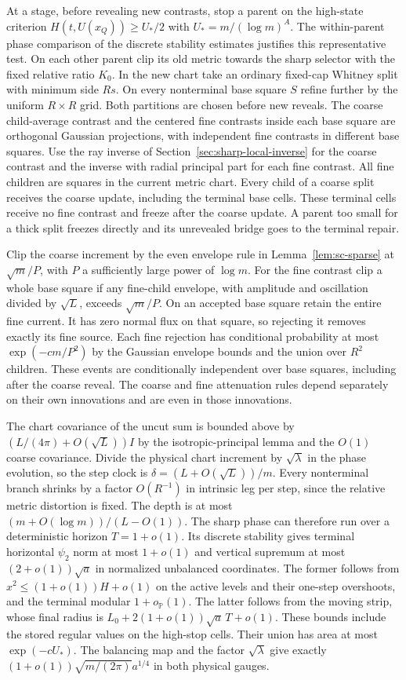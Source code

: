 \documentclass[11pt]{article}
\newcommand{\1}{\mathbf{1}}
\numberwithin{equation}{section}
\begin{document}
At a stage, before revealing new contrasts, stop a parent on
the high-state criterion $H(t,U(x_Q))\ge U_*/2$ with
$U_*=m/(\log m)^A$. The within-parent phase comparison of the
discrete stability estimates justifies this representative
test. On each other parent clip its old metric towards the
sharp selector with the fixed relative ratio $K_0$. In the new
chart take an ordinary fixed-cap Whitney split with minimum
side $Rs$. On every nonterminal base square $S$ refine further
by the uniform $R\times R$ grid. Both partitions are chosen
before new reveals. The coarse child-average contrast and
the centered fine contrasts inside each base square are
orthogonal Gaussian projections, with independent fine
contrasts in different base squares. Use the ray inverse of Section~\ref{sec:sharp-local-inverse} for
the coarse contrast and the inverse with radial principal part for
each fine contrast. All fine children are squares
in the current metric chart. Every child of a coarse split receives the coarse update, including
the terminal base cells. These terminal cells receive no fine contrast
and freeze after the coarse update. A parent too small for a thick
split freezes directly and its unrevealed bridge goes to the terminal
repair.

Clip the coarse increment by the even envelope rule in
Lemma~\ref{lem:sc-sparse} at $\sqrt m/P$, with $P$ a sufficiently large power of
$\log m$. For the fine contrast clip a whole base square if any
fine-child envelope, with amplitude and oscillation divided by
$\sqrt L$, exceeds $\sqrt m/P$. On an accepted base square retain
the entire fine current. It has zero normal flux on that square,
so rejecting it removes exactly its fine source.
Each fine rejection has conditional probability at most
$\exp(-c m/P^2)$ by the Gaussian envelope bounds and the union
over $R^2$ children. These events are conditionally independent
over base squares, including after the coarse reveal. The
coarse and fine attenuation rules depend separately on their
own innovations and are even in those innovations.

The chart covariance of the uncut sum is bounded above by
$(L/(4\pi)+O(\sqrt L))I$ by the isotropic-principal lemma and
the $O(1)$ coarse covariance. Divide the physical chart increment
by $\sqrt\lambda$ in the phase evolution, so the step clock is
$\delta=(L+O(\sqrt L))/m$. Every nonterminal branch shrinks by
a factor $O(R^{-1})$ in intrinsic leg per step, since the relative
metric distortion is fixed. The depth is at most
$(m+O(\log m))/(L-O(1))$. The sharp phase can therefore run over
a deterministic horizon $T=1+o(1)$. Its discrete stability gives
terminal horizontal $\psi_2$ norm at most $1+o(1)$ and vertical
supremum at most $(2+o(1))\sqrt a$ in normalized unbalanced
coordinates. The former follows from $x^2\le(1+o(1))H+o(1)$
on the active levels and their one-step overshoots, and the
terminal modular $1+o_{\mathbb P}(1)$. The latter follows from
the moving strip, whose final radius is
$L_0+2(1+o(1))\sqrt a\,T+o(1)$. These bounds include the stored
regular values on the high-stop cells. Their union has area at
most $\exp(-cU_*)$. The balancing map and the factor
$\sqrt\lambda$ give exactly
$(1+o(1))\sqrt{m/(2\pi)}a^{1/4}$ in both physical gauges.
\end{document}
